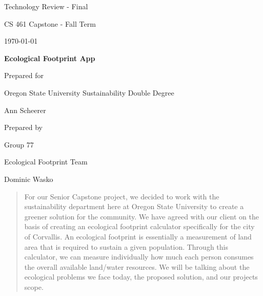 \documentclass[onecolumn, draftclsnofoot,10pt, compsoc]{IEEEtran}
\def \GroupMemberOne{			Dominic Wasko}
\def \CapstoneProjectName{		Ecological Footprint App}
\def \CapstoneSponsorCompany{	Oregon State University Sustainability Double Degree}
\def \CapstoneSponsorPerson{		Ann Scheerer}
\def \DocType{Technology Review - Final}
\def \CapstoneTeamNumber{		77}
\def \CapstoneTeamName{		Ecological Footprint Team}
\newcommand{\NameSigPair}[1]{\par
\makebox[2.75in][r]{#1} \hfil 	\makebox[3.25in]{\makebox[2.25in]{\hrulefill} \hfill		\makebox[.75in]{\hrulefill}}
\par\vspace{-12pt} \textit{\tiny\noindent
\makebox[2.75in]{} \hfil		\makebox[3.25in]{\makebox[2.25in][r]{Signature} \hfill	\makebox[.75in][r]{Date}}}}
\renewcommand{\NameSigPair}[1]{#1}
\begin{document}
\begin{titlepage}
    \begin{singlespace}
        \hfill 
        \par\vspace{.2in}
        \centering
        \scshape{
	 \huge \DocType \par
            \huge CS 461 Capstone - Fall Term \par
            {\large\today}\par
            \vspace{.5in}
            \textbf{\Huge\CapstoneProjectName}\par
            \vfill
            {\large Prepared for}\par
            \Huge \CapstoneSponsorCompany\par
            \vspace{5pt}
            {\Large\NameSigPair{\CapstoneSponsorPerson}\par}
            {\large Prepared by }\par
            Group\CapstoneTeamNumber\par
            \CapstoneTeamName\par 
            
            \vspace{5pt}
            {\Large
                \NameSigPair{\GroupMemberOne}\par
            }
            \vspace{20pt}
        }
        \begin{abstract}
        	For our Senior Capstone project, we decided to work with the sustainability department here at Oregon State University to create a greener solution for the community. 
	We have agreed with our client on the basis of creating an ecological footprint calculator specifically for the city of Corvallis.
	An ecological footprint is essentially a measurement of land area that is required to sustain a given population. 
	Through this calculator, we can measure individually how much each person consumes the overall available land/water resources. 
	We will be talking about the ecological problems we face today, the proposed solution, and our projects scope.
        \end{abstract}     
    \end{singlespace}
\end{titlepage}
\newpage
{}
\tableofcontents
\listoffigures
\listoftables
\clearpage
\end{document}
